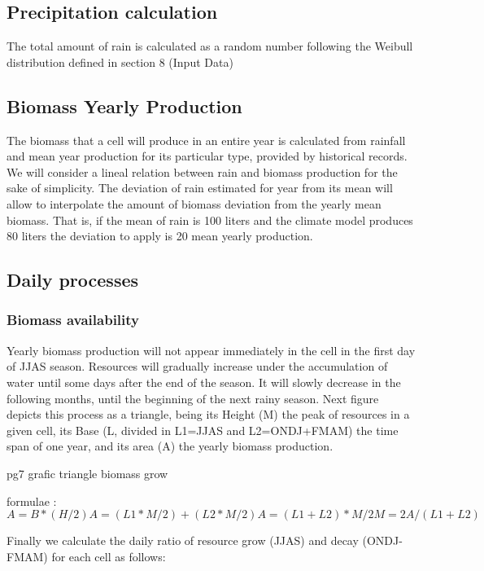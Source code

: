 \begin{enumerate}
\begin{enumerate}
\begin{enumeration}
\subsection{Precipitation calculation}
The total amount of rain is calculated as a random number following the Weibull distribution defined in
section 8 (Input Data)
\subsection{Biomass Yearly Production}
The biomass that a cell will produce in an entire year is calculated from rainfall and mean year
production for its particular type, provided by historical records.
We will consider a lineal relation between rain and biomass production for the sake of simplicity. The
deviation of rain estimated for year from its mean will allow to interpolate the amount of biomass
deviation from the yearly mean biomass. That is, if the mean of rain is 100 liters and the climate model
produces 80 liters the deviation to apply is 20%
mean yearly production.

\subsection{Daily processes}

\subsubsection{Biomass availability}
Yearly biomass production will not appear immediately in the cell in the first day of JJAS season.
Resources will gradually increase under the accumulation of water until some days after the end of the
season. It will slowly decrease in the following months, until the beginning of the next rainy season.
Next figure depicts this process as a triangle, being its Height (M) the peak of resources in a given cell,
its Base (L, divided in L1=JJAS and L2=ONDJ+FMAM) the time span of one year, and its area (A) the
yearly biomass production.

pg7 grafic triangle biomass grow

formulae : 
\begin{equation}
	A=B * (H/2)
	A=(L1*M/2)+(L2*M/2)
	A=(L1+L2)*M/2
	M=2A/(L1+L2)
\end{equation}

Finally we calculate the daily ratio of resource grow (JJAS) and decay (ONDJ-FMAM) for each cell as
follows:


\end{enumeration}
\end{enumerate}
\end{enumerate}
